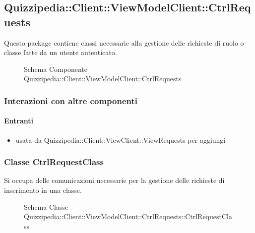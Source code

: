 \subsection{Quizzipedia::Client::ViewModelClient::CtrlRequests}
Questo package contiene classi necessarie alla gestione delle richieste di ruolo o classe fatte da un utente autenticato.
\begin{figure}[H]
\centering
\noindent{}
\caption[Schema Componente Quizzipedia::Client::ViewModelClient::CtrlRequests]{Schema Componente Quizzipedia::Client::ViewModelClient::CtrlRequests}
\end{figure}
\subsubsection{Interazioni con altre componenti}
\paragraph{Entranti}
\begin{itemize}
\item usata da Quizzipedia::Client::ViewClient::ViewRequests per aggiungi
\end{itemize}
\subsubsection{Classe CtrlRequestClass}
Si occupa delle comunicazioni necessarie per la gestione delle richieste di inserimento in una classe.
\begin{figure}[H]
\centering
\noindent{}
\caption[Schema Classe CtrlRequestClass]{Schema Classe Quizzipedia::Client::ViewModelClient::CtrlRequests::CtrlRequestClass}
\end{figure}
